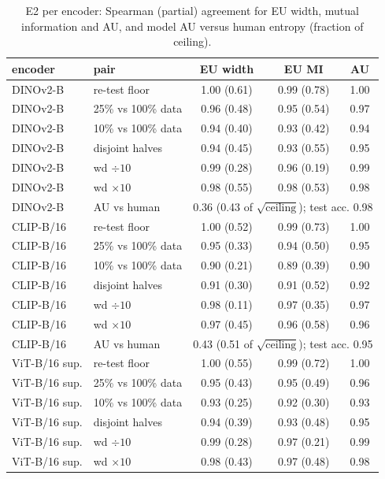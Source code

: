 \begin{table}[h]
\centering
\caption{E2 per encoder: Spearman (partial) agreement for EU width, mutual information and AU, and model AU versus human entropy (fraction of ceiling).}
\small
\begin{tabular}{llccc}
\toprule
encoder & pair & EU width & EU MI & AU \\
\midrule
DINOv2-B & re-test floor & 1.00 (0.61) & 0.99 (0.78) & 1.00 \\
DINOv2-B & 25\% vs 100\% data & 0.96 (0.48) & 0.95 (0.54) & 0.97 \\
DINOv2-B & 10\% vs 100\% data & 0.94 (0.40) & 0.93 (0.42) & 0.94 \\
DINOv2-B & disjoint halves & 0.94 (0.45) & 0.93 (0.55) & 0.95 \\
DINOv2-B & wd $\div10$ & 0.99 (0.28) & 0.96 (0.19) & 0.99 \\
DINOv2-B & wd $\times10$ & 0.98 (0.55) & 0.98 (0.53) & 0.98 \\
DINOv2-B & AU vs human & \multicolumn{3}{c}{0.36 (0.43 of $\sqrt{\text{ceiling}}$); test acc. 0.98} \\ \midrule
CLIP-B/16 & re-test floor & 1.00 (0.52) & 0.99 (0.73) & 1.00 \\
CLIP-B/16 & 25\% vs 100\% data & 0.95 (0.33) & 0.94 (0.50) & 0.95 \\
CLIP-B/16 & 10\% vs 100\% data & 0.90 (0.21) & 0.89 (0.39) & 0.90 \\
CLIP-B/16 & disjoint halves & 0.91 (0.30) & 0.91 (0.52) & 0.92 \\
CLIP-B/16 & wd $\div10$ & 0.98 (0.11) & 0.97 (0.35) & 0.97 \\
CLIP-B/16 & wd $\times10$ & 0.97 (0.45) & 0.96 (0.58) & 0.96 \\
CLIP-B/16 & AU vs human & \multicolumn{3}{c}{0.43 (0.51 of $\sqrt{\text{ceiling}}$); test acc. 0.95} \\ \midrule
ViT-B/16 sup. & re-test floor & 1.00 (0.55) & 0.99 (0.72) & 1.00 \\
ViT-B/16 sup. & 25\% vs 100\% data & 0.95 (0.43) & 0.95 (0.49) & 0.96 \\
ViT-B/16 sup. & 10\% vs 100\% data & 0.93 (0.25) & 0.92 (0.30) & 0.93 \\
ViT-B/16 sup. & disjoint halves & 0.94 (0.39) & 0.93 (0.48) & 0.95 \\
ViT-B/16 sup. & wd $\div10$ & 0.99 (0.28) & 0.97 (0.21) & 0.99 \\
ViT-B/16 sup. & wd $\times10$ & 0.98 (0.43) & 0.97 (0.48) & 0.98 \\

\end{tabular}
\end{table}
